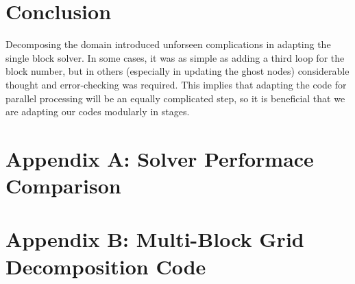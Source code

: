 \documentclass[twocolumn,10pt]{asme2ej}
\begin{document}
\section{Conclusion}

Decomposing the domain introduced unforseen complications in adapting the single block solver.  In some cases, it was as simple as adding a third loop for the block number, but in others (especially in updating the ghost nodes) considerable thought and error-checking was required.  This implies that adapting the code for parallel processing will be an equally complicated step, so it is beneficial that we are adapting our codes modularly in stages.









\onecolumn
\appendix       %

\section*{Appendix A: Solver Performace Comparison} \label{times}
% 
% 

\section*{Appendix B: Multi-Block Grid Decomposition Code}

\end{document}

